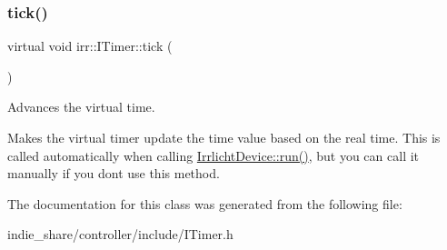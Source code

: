 \subsubsection{\texorpdfstring{tick()}{tick()}\hspace{0.1cm}{\footnotesize\ttfamily [2/2]}}
{\footnotesize\ttfamily virtual void irr\+::\+I\+Timer\+::tick (\begin{DoxyParamCaption}{ }\end{DoxyParamCaption})\hspace{0.3cm}{\ttfamily [pure virtual]}}



Advances the virtual time. 

Makes the virtual timer update the time value based on the real time. This is called automatically when calling \hyperlink{classirr_1_1IrrlichtDevice_a0489f8151dc43f6f41503ffb5a160b35}{Irrlicht\+Device\+::run()}, but you can call it manually if you don\textquotesingle{}t use this method. 

The documentation for this class was generated from the following file\+:\begin{DoxyCompactItemize}
\item 
indie\+\_\+share/controller/include/I\+Timer.\+h\end{DoxyCompactItemize}
